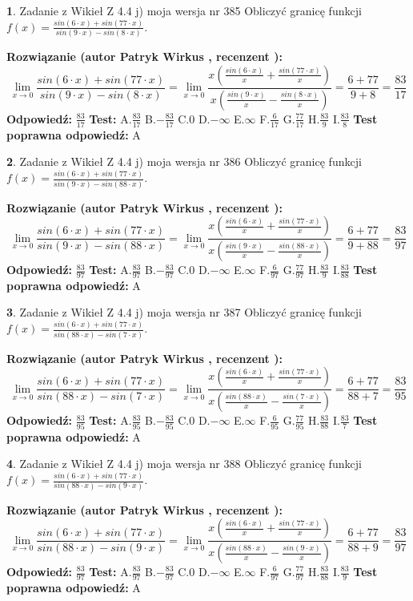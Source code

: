 \documentclass[12pt, a4paper]{article}
\theoremstyle{definition} %
\newtheorem{zad}{}
\newcommand{\zadStart}[1]{\begin{zad}#1\newline}
\newcommand{\zadStop}{\end{zad}}
\newcommand{\rozwStart}[2]{\noindent \textbf{Rozwiązanie (autor #1 , recenzent #2): }\newline}
\newcommand{\rozwStop}{\newline}
\newcommand{\odpStart}{\noindent \textbf{Odpowiedź:}\newline}
\newcommand{\odpStop}{\newline}
\newcommand{\testStart}{\noindent \textbf{Test:}\newline}
\newcommand{\testStop}{\newline}
\newcommand{\kluczStart}{\noindent \textbf{Test poprawna odpowiedź:}\newline}
\newcommand{\kluczStop}{\newline}
\begin{document}
\zadStart{Zadanie z Wikieł Z 4.4 j) moja wersja nr 385}
Obliczyć granicę funkcji $f(x)=\frac{sin(6\cdot x) +sin(77\cdot x)}{sin(9\cdot x) -sin(8\cdot x)}$.
\zadStop
\rozwStart{Patryk Wirkus}{}
$$\lim\limits_{x\to 0}\frac{sin(6\cdot x) +sin(77\cdot x)}{sin(9\cdot x) -sin(8\cdot x)}=\lim\limits_{x\to 0}\frac{x(\frac{sin(6\cdot x)}{x}+\frac{sin(77\cdot x)}{x})}{x(\frac{sin(9\cdot x)}{x}-\frac{sin(8\cdot x)}{x})}=\frac{6+77}{9+8} = \frac{83}{17}$$
\rozwStop
\odpStart
$\frac{83}{17}$
\odpStop
\testStart
A.$\frac{83}{17}$
B.$-\frac{83}{17}$
C.$0$
D.$-\infty$
E.$\infty$
F.$\frac{6}{17}$
G.$\frac{77}{17}$
H.$\frac{83}{9}$
I.$\frac{83}{8}$
\testStop
\kluczStart
A
\kluczStop



\zadStart{Zadanie z Wikieł Z 4.4 j) moja wersja nr 386}
Obliczyć granicę funkcji $f(x)=\frac{sin(6\cdot x) +sin(77\cdot x)}{sin(9\cdot x) -sin(88\cdot x)}$.
\zadStop
\rozwStart{Patryk Wirkus}{}
$$\lim\limits_{x\to 0}\frac{sin(6\cdot x) +sin(77\cdot x)}{sin(9\cdot x) -sin(88\cdot x)}=\lim\limits_{x\to 0}\frac{x(\frac{sin(6\cdot x)}{x}+\frac{sin(77\cdot x)}{x})}{x(\frac{sin(9\cdot x)}{x}-\frac{sin(88\cdot x)}{x})}=\frac{6+77}{9+88} = \frac{83}{97}$$
\rozwStop
\odpStart
$\frac{83}{97}$
\odpStop
\testStart
A.$\frac{83}{97}$
B.$-\frac{83}{97}$
C.$0$
D.$-\infty$
E.$\infty$
F.$\frac{6}{97}$
G.$\frac{77}{97}$
H.$\frac{83}{9}$
I.$\frac{83}{88}$
\testStop
\kluczStart
A
\kluczStop



\zadStart{Zadanie z Wikieł Z 4.4 j) moja wersja nr 387}
Obliczyć granicę funkcji $f(x)=\frac{sin(6\cdot x) +sin(77\cdot x)}{sin(88\cdot x) -sin(7\cdot x)}$.
\zadStop
\rozwStart{Patryk Wirkus}{}
$$\lim\limits_{x\to 0}\frac{sin(6\cdot x) +sin(77\cdot x)}{sin(88\cdot x) -sin(7\cdot x)}=\lim\limits_{x\to 0}\frac{x(\frac{sin(6\cdot x)}{x}+\frac{sin(77\cdot x)}{x})}{x(\frac{sin(88\cdot x)}{x}-\frac{sin(7\cdot x)}{x})}=\frac{6+77}{88+7} = \frac{83}{95}$$
\rozwStop
\odpStart
$\frac{83}{95}$
\odpStop
\testStart
A.$\frac{83}{95}$
B.$-\frac{83}{95}$
C.$0$
D.$-\infty$
E.$\infty$
F.$\frac{6}{95}$
G.$\frac{77}{95}$
H.$\frac{83}{88}$
I.$\frac{83}{7}$
\testStop
\kluczStart
A
\kluczStop



\zadStart{Zadanie z Wikieł Z 4.4 j) moja wersja nr 388}
Obliczyć granicę funkcji $f(x)=\frac{sin(6\cdot x) +sin(77\cdot x)}{sin(88\cdot x) -sin(9\cdot x)}$.
\zadStop
\rozwStart{Patryk Wirkus}{}
$$\lim\limits_{x\to 0}\frac{sin(6\cdot x) +sin(77\cdot x)}{sin(88\cdot x) -sin(9\cdot x)}=\lim\limits_{x\to 0}\frac{x(\frac{sin(6\cdot x)}{x}+\frac{sin(77\cdot x)}{x})}{x(\frac{sin(88\cdot x)}{x}-\frac{sin(9\cdot x)}{x})}=\frac{6+77}{88+9} = \frac{83}{97}$$
\rozwStop
\odpStart
$\frac{83}{97}$
\odpStop
\testStart
A.$\frac{83}{97}$
B.$-\frac{83}{97}$
C.$0$
D.$-\infty$
E.$\infty$
F.$\frac{6}{97}$
G.$\frac{77}{97}$
H.$\frac{83}{88}$
I.$\frac{83}{9}$
\testStop
\kluczStart
A
\kluczStop
\end{document}
